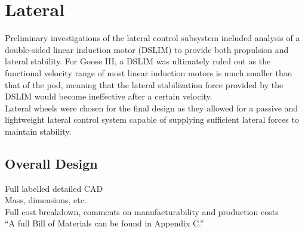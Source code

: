 \documentclass[main.tex]{subfiles}
\begin{document}
    \chapter{Lateral}
    \label{ch:lateral}
    
    Preliminary investigations of the lateral control subsystem included analysis of a double-sided linear induction motor (DSLIM) to provide both propulsion and lateral stability. For Goose III, a DSLIM was ultimately ruled out as the functional velocity range of most linear induction motors is much smaller than that of the pod, meaning that the lateral stabilization force provided by the DSLIM would become ineffective after a certain velocity.\\
    Lateral wheels were chosen for the final design as they allowed for a passive and lightweight lateral control system capable of supplying sufficient lateral forces to maintain stability.

    \section{Overall Design}
    Full labelled detailed CAD\\
    Mass, dimensions, etc.\\
    Full cost breakdown, comments on manufacturability and production costs\\
    “A full Bill of Materials can be found in Appendix C.”
\end{document}
